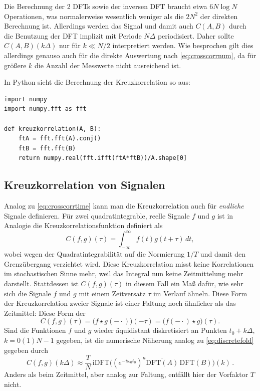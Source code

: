 Die Berechnung der 2 DFTs sowie der inversen DFT braucht etwa $6 N\log
N$ Operationen, was normalerweise wesentlich weniger als die $2N^2$
der direkten Berechnung ist.  Allerdings werden das Signal und damit
auch $C(A,B)$ durch die Benutzung der DFT implizit mit Periode
$N\Delta$ periodisiert. Daher sollte $C(A,B)(k\Delta)$ nur für $k\ll
N/2$ interpretiert werden. Wie besprochen gilt dies allerdings genauso
auch für die direkte Auswertung nach \eqref{eq:crosscorrnum}, da für
größere $k$ die Anzahl der Messwerte nicht ausreichend ist.

In Python sieht die Berechnung der Kreuzkorrelation so aus:
\begin{lstlisting}
import numpy
import numpy.fft as fft

def kreuzkorrelation(A, B):
    ftA = fft.fft(A).conj()
    ftB = fft.fft(B)
    return numpy.real(fft.ifft(ftA*ftB))/A.shape[0]
\end{lstlisting}

\subsection{Kreuzkorrelation von Signalen}

Analog zu \eqref{eq:crosscorrtime} kann man die Kreuzkorrelation auch
für \emph{endliche} Signale definieren. Für zwei quadratintegrable, reelle
Signale $f$ und $g$ ist in Analogie die Kreuzkorrelationsfunktion
definiert als
\begin{equation}
  C(f,g)(\tau) = \int_{-\infty}^{\infty} f(t)g(t+\tau)\,dt,
\end{equation}
wobei wegen der Quadratintegrabilität auf die Normierung $1/T$ und
damit den Grenzübergang verzichtet wird. Diese Kreuzkorrelation misst
keine Korrelationen im stochastischen Sinne mehr, weil das Integral
nun keine Zeitmittelung mehr darstellt. Stattdessen ist $C(f,g)(\tau)$
in diesem Fall ein Maß dafür, wie sehr sich die Signale $f$ und $g$
mit einem Zeitversatz $\tau$ im Verlauf ähneln. Diese Form der
Kreuzkorrelation zweier Signale ist einer Faltung noch ähnlicher als
das Zeitmittel: Diese Form der
\begin{equation}
  C(f,g)(\tau) = \bigl(f \star g(-\cdot)\bigr)(-\tau) =
  \bigl(f(-\cdot) \star g\bigr)(\tau).
\end{equation}
Sind die Funktionen $f$ und $g$ wieder äquidistant diskretisiert an
Punkten $t_0 + k\Delta$, $k=0(1)N-1$ gegeben, ist die numerische
Näherung analog zu \eqref{eq:discretefold} gegeben durch
\begin{equation}
  C(f,g)(k\Delta)
  \approx
  \frac{T}{N}\,\text{iDFT}
  \bigl(\left(e^{-i\omega_0 t_0}\right)^n\overline{\text{DFT}(A)}\,\text{DFT}(B)\bigr)(k)\,.
\end{equation}
Anders als beim Zeitmittel, aber analog zur Faltung, entfällt hier der
Vorfaktor $T$ nicht.

